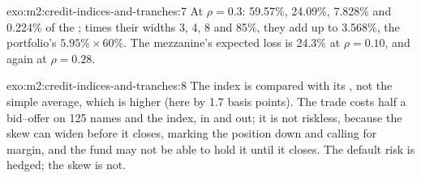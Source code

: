 \begin{solution}{exo:m2:credit-indices-and-tranches:7}
At $\rho = 0.3$: 59.57\%, 24.09\%, 7.828\% and 0.224\% of the ; times their
widths 3, 4, 8 and 85\%, they add up to 3.568\%, the portfolio's $5.95\% \times 60\%$.
The mezzanine's expected loss is 24.3\% at $\rho = 0.10$, and again at $\rho = 0.28$.
\end{solution}

\begin{solution}{exo:m2:credit-indices-and-tranches:8}
The index is compared with its , not the simple average, which is
higher (here by 1.7 basis points). The trade costs half a bid--offer on 125 names and
the index, in and out; it is not riskless, because the skew can widen before it
closes, marking the position down and calling for margin, and the fund may not be able
to hold it until it closes. The default risk is hedged; the skew is not.
\end{solution}


